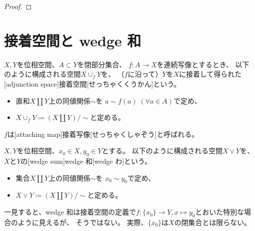 \documentclass[report]{jlreq}
\begin{document}
\begin{proof}
    \TODO{}
\end{proof}

%
\section{接着空間と wedge 和}


\begin{definition}[接着空間]
    $X, Y$を位相空間、$A \subset Y$を閉部分集合、
    $f \colon A \to X$を連続写像とするとき、
    以下のように構成される空間$X \cup_f Y$を、
    （$f$に沿って）$Y$を$X$に接着して得られた
    [adjunction space]{接着空間}[せっちゃくくうかん]という。
    \begin{itemize}
        \item 直和$X \amalg Y$上の同値関係$\sim$を
            $a \sim f(a)\; (\forall a \in A)$で定め、
        \item $X \cup_f Y \coloneqq (X \amalg Y) / \sim$と定める。
    \end{itemize}
    $f$は[attaching map]{接着写像}[せっちゃくしゃぞう]と呼ばれる。
\end{definition}


\begin{definition}[wedge 和]
    $X, Y$を位相空間、$x_0 \in X, y_0 \in Y$とする。
    以下のように構成される空間$X \vee Y$を、
    $X$と$Y$の[wedge sum]{wedge 和}[wedge わ]という。
    \begin{itemize}
        \item 集合$X \amalg Y$上の同値関係$\sim$を
            $x_0 \sim y_0$で定め、
        \item $X \vee Y \coloneqq (X \amalg Y) / \sim$と定める。
    \end{itemize}
\end{definition}

\begin{remark}
    一見すると、wedge 和は接着空間の定義で$f \colon \{x_0\} \to Y, x \mapsto y_0$とおいた特別な場合のように見えるが、
    そうではない。
    実際、$\{x_0\}$は$X$の閉集合とは限らない。
\end{remark}
\end{document}
